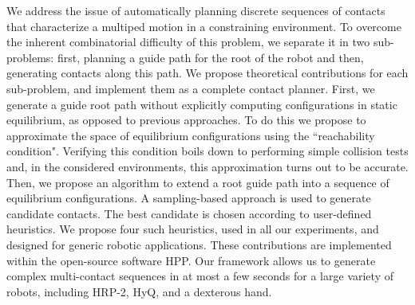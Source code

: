 We address the issue of automatically planning discrete sequences of contacts
that characterize a multiped motion in a constraining environment.
To overcome the inherent combinatorial difficulty of this problem, we separate it
in two sub-problems: first, planning a guide path for the root of the robot and
then, generating contacts along this path.
We propose theoretical contributions for each sub-problem, and implement them
as a complete contact planner. 
First, we generate a guide root path without explicitly computing configurations in static equilibrium, as opposed to previous approaches.
To do this we propose to approximate the space of equilibrium configurations using the ``reachability condition".
Verifying this condition boils down to performing simple collision tests and, in the considered environments, this approximation turns out to be accurate.
Then, we propose an algorithm to extend a root guide path into a sequence of equilibrium configurations.
A sampling-based approach is used to generate candidate contacts.
The best candidate is chosen according to user-defined heuristics. We propose four such heuristics, used in all our experiments, and 
designed for generic robotic applications.
These contributions are implemented within the open-source software HPP. Our framework allows us to generate complex multi-contact sequences in at most a few seconds for a large variety of robots, including HRP-2, HyQ, and a dexterous hand.
